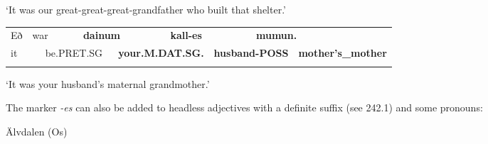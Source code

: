 \footnotetext{}

\begin{styleTranslation}
‘It was our great-great-great-grandfather who built that shelter.’

\end{styleTranslation}

\begin{tabular}{llllllllll}
\lsptoprule
Eð & \multicolumn{2}{l}{war

} & \multicolumn{2}{l}{{\bfseries dainum}

} & \multicolumn{2}{l}{{\bfseries kall-es}

} & \multicolumn{2}{l}{{\bfseries mumun.}

} & \\
\multicolumn{2}{l}{it

} & \multicolumn{2}{l}{be.PRET.SG

} & \multicolumn{2}{l}{{\bfseries your.M.DAT.SG.}

} & \multicolumn{2}{l}{{\bfseries husband-POSS}

} & \multicolumn{2}{l}{{\bfseries mother’s\_mother}

}\\
\lspbottomrule
\end{tabular}

\begin{styleTranslation}
‘It was your husband’s maternal grandmother.’

\end{styleTranslation}

\begin{styleBodyTextFirst}
The marker\textit{ -}\textit{es} can also be added to headless adjectives with a definite suffix (see 242.1) and some pronouns:

\end{styleBodyTextFirst}


\begin{listWWNumileveli}
\item {}

\begin{styleExample}
Älvdalen (Os)\ \ 

\end{styleExample}

\end{listWWNumileveli}

\begin{listWWNumlxxixleveli}
\item {}

\end{listWWNumlxxixleveli}

